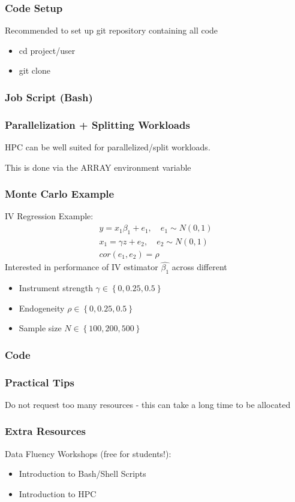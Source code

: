 \documentclass[aspectratio=169,notheorems]{beamer}
\theoremstyle{plain}
\theoremstyle{plain}
\numberwithin{equation}{section}
\begin{document}
\begin{frame}
\frametitle{Code Setup}
Recommended to set up git repository containing all code
\begin{itemize}
\item cd project/user
\item git clone
\end{itemize}

\end{frame}

\begin{frame}
\frametitle{Job Script (Bash)}


\end{frame}


\begin{frame}
\frametitle{Parallelization + Splitting Workloads}
HPC can be well suited for parallelized/split workloads.

This is done via the ARRAY environment variable
\end{frame}

\begin{frame}
\frametitle{Monte Carlo Example}
IV Regression Example:
\begin{align}
y = x_1 \beta_1 + e_1, \quad e_1 \sim N (0, 1) \\
x_1 = \gamma z + e_2, \quad e_2 \sim N(0, 1) \\
cor(e_1, e_2) = \rho
\end{align}
Interested in performance of IV estimator $\widehat{\beta_1}$ across different 
\begin{itemize}
\item Instrument strength $\gamma \in \left\lbrace 0, 0.25, 0.5\right\rbrace $
\item Endogeneity $\rho \in \left\lbrace 0, 0.25, 0.5 \right\rbrace $
\item Sample size $N \in \left\lbrace 100, 200, 500 \right\rbrace $
\end{itemize}
\end{frame}

\begin{frame}
\frametitle{Code}

\end{frame}

\begin{frame}
\frametitle{Practical Tips}
Do not request too many resources - this can take a long time to be allocated
\end{frame}

\begin{frame}
\frametitle{Extra Resources}
Data Fluency Workshops (free for students!):
\begin{itemize}
\item Introduction to Bash/Shell Scripts
\item Introduction to HPC
\end{itemize}
\end{frame}
\end{document}
